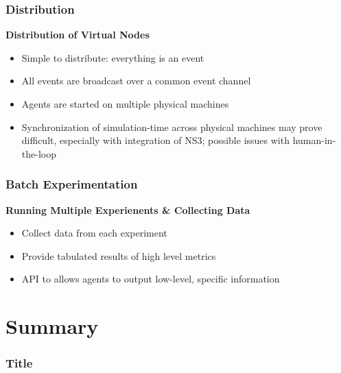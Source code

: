 \documentclass[mathserif]{beamer}
\begin{document}
\frame
{
    \frametitle{Distribution}
    \textbf{Distribution of Virtual Nodes}
    \begin{itemize}
	\item Simple to distribute: everything is an event
	\item All events are broadcast over a common event channel
	\item Agents are started on multiple physical machines
	\item Synchronization of simulation-time across physical machines may prove difficult, especially with integration of NS3; possible issues with human-in-the-loop
    \end{itemize}
}

\frame
{
    \frametitle{Batch Experimentation}
    \textbf{Running Multiple Experienents \& Collecting Data}
    \begin{itemize}
        \item Collect data from each experiment
        \item Provide tabulated results of high level metrics
        \item API to allows agents to output low-level, specific information
    \end{itemize}
}

\section{Summary}

\frame
{
    \frametitle{Title}
}
\end{document}
